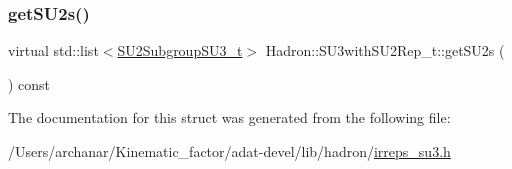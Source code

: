 \subsubsection{\texorpdfstring{getSU2s()}{getSU2s()}\hspace{0.1cm}{\footnotesize\ttfamily [3/3]}}
{\footnotesize\ttfamily virtual std\+::list$<$\mbox{\hyperlink{structHadron_1_1SU2SubgroupSU3__t}{S\+U2\+Subgroup\+S\+U3\+\_\+t}}$>$ Hadron\+::\+S\+U3with\+S\+U2\+Rep\+\_\+t\+::get\+S\+U2s (\begin{DoxyParamCaption}{ }\end{DoxyParamCaption}) const\hspace{0.3cm}{\ttfamily [pure virtual]}}



The documentation for this struct was generated from the following file\+:\begin{DoxyCompactItemize}
\item 
/\+Users/archanar/\+Kinematic\+\_\+factor/adat-\/devel/lib/hadron/\mbox{\hyperlink{adat-devel_2lib_2hadron_2irreps__su3_8h}{irreps\+\_\+su3.\+h}}\end{DoxyCompactItemize}
